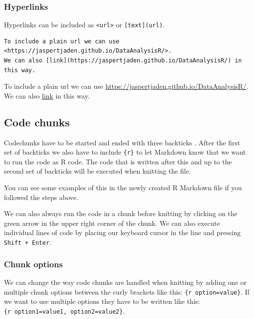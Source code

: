 \documentclass[
]{book}
\begin{document}
\hypertarget{hyperlinks}{%
\subsubsection{Hyperlinks}\label{hyperlinks}}

Hyperlinks can be included as \texttt{\textless{}url\textgreater{}} or \texttt{{[}text{]}(url)}.

\begin{verbatim}
To include a plain url we can use <https://jaspertjaden.github.io/DataAnalysisR/>.
We can also [link](https://jaspertjaden.github.io/DataAnalysisR/) in this way.
\end{verbatim}

To include a plain url we can use \url{https://jaspertjaden.github.io/DataAnalysisR/}. We can also \href{https://jaspertjaden.github.io/DataAnalysisR/}{link} in this way.

\hypertarget{code-chunks}{%
\subsection{Code chunks}\label{code-chunks}}

Codechunks have to be started and ended with three backticks \texttt{\textasciigrave{}\textasciigrave{}\textasciigrave{}}. After the first set of backticks we also have to include \texttt{\{r\}} to let Markdown know that we want to run the code as R code. The code that is written after this and up to the second set of backticks will be executed when knitting the file.

You can see some examples of this in the newly created R Markdown file if you followed the steps above.

We can also always run the code in a chunk before knitting by clicking on the green arrow in the upper right corner of the chunk. We can also execute individual lines of code by placing our keyboard cursor in the line and pressing \texttt{Shift\ +\ Enter}.

\hypertarget{chunk-options}{%
\subsubsection{Chunk options}\label{chunk-options}}

We can change the way code chunks are handled when knitting by adding one or multiple chunk options between the curly brackets like this: \texttt{\{r\ option=value\}}. If we want to use multiple options they have to be written like this: \texttt{\{r\ option1=value1,\ option2=value2\}}.
\end{document}
